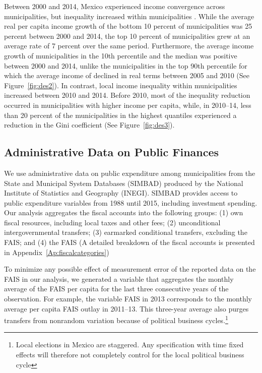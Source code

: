 \documentclass[dv_diss_main.tex]{subfiles}
\begin{document}
Between 2000 and 2014, Mexico experienced income convergence across municipalities, but inequality increased within municipalities \cite{lopez2019poverty}. While the average real per capita income growth of the bottom 10 percent of municipalities was 25 percent between 2000 and 2014, the top 10 percent of municipalities grew at an average rate of  7 percent over the same period. Furthermore, the average income growth of municipalities in the 10th percentile and the median was positive between 2000 and 2014, unlike the municipalities in the top 90th percentile for which the average income of declined in real terms between 2005 and 2010 (See Figure~\ref{fig:des2}). In contrast, local income inequality within municipalities increased between 2010 and 2014. Before 2010, most of the inequality reduction occurred in municipalities with higher income per capita, while, in 2010–14, less than 20 percent of the municipalities in the highest quantiles experienced a reduction in the Gini coefficient (See Figure~\ref{fig:des3}).



    \subsection {Administrative Data on Public Finances} \label{subsec:adminis}


We use administrative data on public expenditure among municipalities from the State and Municipal System Databases (SIMBAD) produced by the National Institute of Statistics and Geography (INEGI). SIMBAD provides access to public expenditure variables from 1988 until 2015, including investment spending. Our analysis aggregates the fiscal accounts into the following groups: (1) own fiscal resources, including local taxes and other fees; (2) unconditional intergovernmental transfers; (3) earmarked conditional transfers, excluding the FAIS; and (4)  the  FAIS  (A detailed breakdown of the fiscal accounts is presented in {Appendix}~\ref{Ap:fiscalcategories})

To minimize any possible effect of measurement error of the reported data on the FAIS in our analysis, we generated a variable that aggregates the monthly average of the FAIS per capita for the last three consecutive years of the observation. For example, the variable FAIS in 2013 corresponds to the monthly average per capita FAIS outlay in 2011–13. This three-year average also purges transfers from nonrandom variation because of political business cycles.\footnote{ Local elections in Mexico are staggered. Any specification with time fixed effects will therefore not completely control for the local political business cycle}
\end{document}
